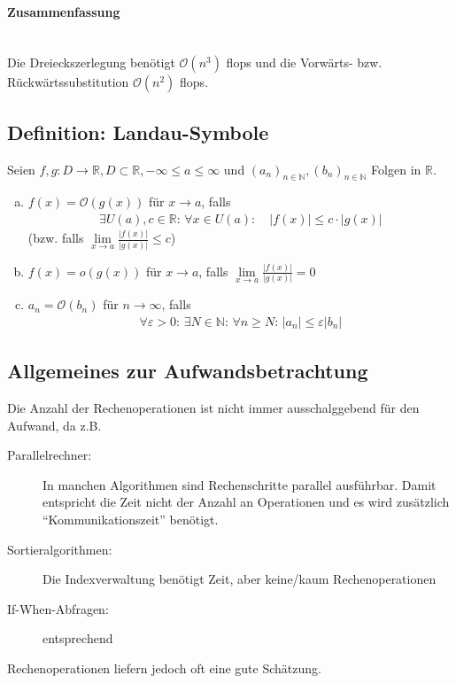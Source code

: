 \documentclass[ngerman,fontsize=11pt, paper=a4, parskip=half, titlepage=true, toc=bib]{scrbook}
\newcommand{\R}{\mathds{R}}
\newcommand{\N}{\mathds{N}}
\begin{document}
\paragraph{Zusammenfassung}~ \\
Die Dreieckszerlegung benötigt $\mathcal{O}(n^3)$ flops und 
die Vorwärts- bzw. Rückwärtssubstitution $\mathcal{O}(n^2)$ flops.



\subsection{Definition: Landau-Symbole} 
Seien $f,g : D\longrightarrow \R, D\subset \R, -\infty\leq a\leq \infty$ und
$(a_n)_{n\in\N}, (b_n)_{n\in\N}$ Folgen in $\R$.
\begin{enumerate}[a)]
	\item $f(x) = \mathcal{O}(g(x))$ für $x\longrightarrow a$, falls
	\begin{gather*}
		\exists U(a), c\in\R:\, \forall x\in U(a) : \quad |f(x)| \leq c\cdot |g(x)|
	\end{gather*}
	(bzw. falls $\lim\limits_{x\rightarrow a}\frac{|f(x)|}{|g(x)|} \leq c$)
	\item $f(x) = o(g(x))$ für $x\longrightarrow a$, falls 
	$\lim\limits_{x\rightarrow a}\frac{|f(x)|}{|g(x)|} = 0$
	\item $a_n = \mathcal{O}(b_n)$ für $n\longrightarrow \infty$, falls
	\begin{gather*}
		\forall \varepsilon > 0 : \, \exists N\in\N : \, \forall n \geq N: \, |a_n| \leq \varepsilon |b_n|
	\end{gather*}
\end{enumerate}

\subsection{Allgemeines zur Aufwandsbetrachtung}
Die Anzahl der Rechenoperationen ist nicht immer ausschalggebend für den Aufwand, da
z.B.
\begin{description}
	\item[Parallelrechner:] In manchen Algorithmen sind Rechenschritte parallel ausführbar.
	Damit entspricht die Zeit nicht der Anzahl an Operationen und es wird zusätzlich
	\enquote{Kommunikationszeit} benötigt.
	\item[Sortieralgorithmen:] Die Indexverwaltung benötigt Zeit, aber keine/kaum Rechenoperationen
	\item[If-When-Abfragen:] entsprechend
\end{description}
Rechenoperationen liefern jedoch oft eine gute Schätzung.
\end{document}
